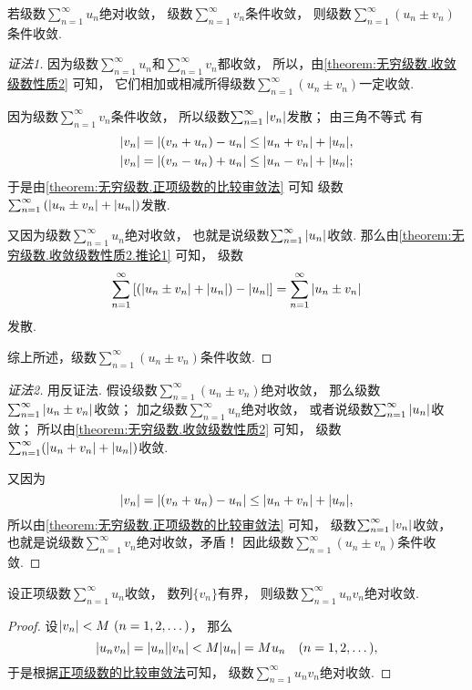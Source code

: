 \begin{proposition}\label{theorem:绝对收敛.命题1}
若级数\(\sum_{n=1}^\infty u_n\)绝对收敛，
级数\(\sum_{n=1}^\infty v_n\)条件收敛，
则级数\(\sum_{n=1}^\infty (u_n \pm v_n)\)条件收敛.
\begin{proof}[证法1]
因为级数\(\sum_{n=1}^\infty u_n\)和\(\sum_{n=1}^\infty v_n\)都收敛，
所以，由\cref{theorem:无穷级数.收敛级数性质2} 可知，
它们相加或相减所得级数\(\sum_{n=1}^\infty (u_n \pm v_n)\)一定收敛.

因为级数\(\sum_{n=1}^\infty v_n\)条件收敛，
所以级数\(\sum_{n=1}^\infty \abs{v_n}\)发散；
由三角不等式  有\begin{align*}
	\abs{v_n}
	= \abs{(v_n + u_n) - u_n}
	\leq \abs{u_n + v_n} + \abs{u_n}, \\
	\abs{v_n}
	= \abs{(v_n - u_n) + u_n}
	\leq \abs{u_n - v_n} + \abs{u_n};
\end{align*}
于是由\cref{theorem:无穷级数.正项级数的比较审敛法} 可知
级数\(\sum_{n=1}^\infty \left( \abs{u_n \pm v_n} + \abs{u_n} \right)\)发散.

又因为级数\(\sum_{n=1}^\infty u_n\)绝对收敛，
也就是说级数\(\sum_{n=1}^\infty \abs{u_n}\)收敛.
那么由\cref{theorem:无穷级数.收敛级数性质2.推论1} 可知，
级数\[
	\sum_{n=1}^\infty \left[
		\left( \abs{u_n \pm v_n} + \abs{u_n} \right) - \abs{u_n}
	\right]
	= \sum_{n=1}^\infty \abs{u_n \pm v_n}
\]发散.

综上所述，级数\(\sum_{n=1}^\infty (u_n \pm v_n)\)条件收敛.
\end{proof}
\begin{proof}[证法2]
用反证法.
假设级数\(\sum_{n=1}^\infty (u_n \pm v_n)\)绝对收敛，
那么级数\(\sum_{n=1}^\infty \abs{u_n \pm v_n}\)收敛；
加之级数\(\sum_{n=1}^\infty u_n\)绝对收敛，
或者说级数\(\sum_{n=1}^\infty \abs{u_n}\)收敛；
所以由\cref{theorem:无穷级数.收敛级数性质2} 可知，
级数\(\sum_{n=1}^\infty (\abs{u_n + v_n} + \abs{u_n})\)收敛.

又因为\[
	\abs{v_n}
	= \abs{(v_n + u_n) - u_n}
	\leq \abs{u_n + v_n} + \abs{u_n},
\]
所以由\cref{theorem:无穷级数.正项级数的比较审敛法} 可知，
级数\(\sum_{n=1}^\infty \abs{v_n}\)收敛，
也就是说级数\(\sum_{n=1}^\infty v_n\)绝对收敛，矛盾！
因此级数\(\sum_{n=1}^\infty (u_n \pm v_n)\)条件收敛.
\end{proof}
\end{proposition}

\begin{proposition}\label{theorem:绝对收敛.命题2}
设正项级数\(\sum_{n=1}^\infty u_n\)收敛，
数列\(\{v_n\}\)有界，
则级数\(\sum_{n=1}^\infty u_n v_n\)绝对收敛.
\begin{proof}
设\(\abs{v_n} < M\ (n=1,2,\dotsc)\)，
那么\[
	\abs{u_n v_n}
	= \abs{u_n} \abs{v_n}
	< M \abs{u_n}
	= M u_n
	\quad(n=1,2,\dotsc),
\]
于是根据\hyperref[theorem:无穷级数.正项级数的比较审敛法的推论]{正项级数的比较审敛法}可知，
级数\(\sum_{n=1}^\infty u_n v_n\)绝对收敛.
\end{proof}
\end{proposition}

